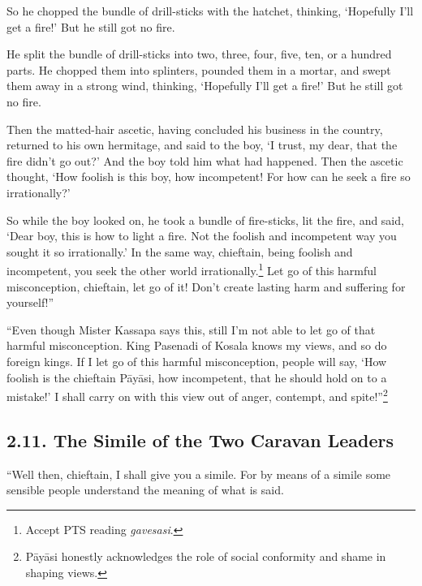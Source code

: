\documentclass[12pt,openany]{book}%
\begin{document}
So he chopped the bundle of drill-sticks with the hatchet, thinking, ‘Hopefully I’ll get a fire!’ But he still got no fire. 

He split the bundle of drill-sticks into two, three, four, five, ten, or a hundred parts. He chopped them into splinters, pounded them in a mortar, and swept them away in a strong wind, thinking, ‘Hopefully I’ll get a fire!’ But he still got no fire. 

Then the matted-hair ascetic, having concluded his business in the country, returned to his own hermitage, and said to the boy, ‘I trust, my dear, that the fire didn’t go out?’ And the boy told him what had happened. Then the ascetic thought, ‘How foolish is this boy, how incompetent! For how can he seek a fire so irrationally?’ 

So while the boy looked on, he took a bundle of fire-sticks, lit the fire, and said, ‘Dear boy, this is how to light a fire. Not the foolish and incompetent way you sought it so irrationally.’ In the same way, chieftain, being foolish and incompetent, you seek the other world irrationally.\footnote{Accept PTS reading \textit{gavesasi}. } Let go of this harmful misconception, chieftain, let go of it! Don’t create lasting harm and suffering for yourself!” 

“Even though Mister Kassapa says this, still I’m not able to let go of that harmful misconception. King Pasenadi of Kosala knows my views, and so do foreign kings. If I let go of this harmful misconception, people will say, ‘How foolish is the chieftain \textsanskrit{Pāyāsi}, how incompetent, that he should hold on to a mistake!’ I shall carry on with this view out of anger, contempt, and spite!”\footnote{\textsanskrit{Pāyāsi} honestly acknowledges the role of social conformity and shame in shaping views. } 

\subsection*{2.11. The Simile of the Two Caravan Leaders }

“Well then, chieftain, I shall give you a simile. For by means of a simile some sensible people understand the meaning of what is said. 
\end{document}
